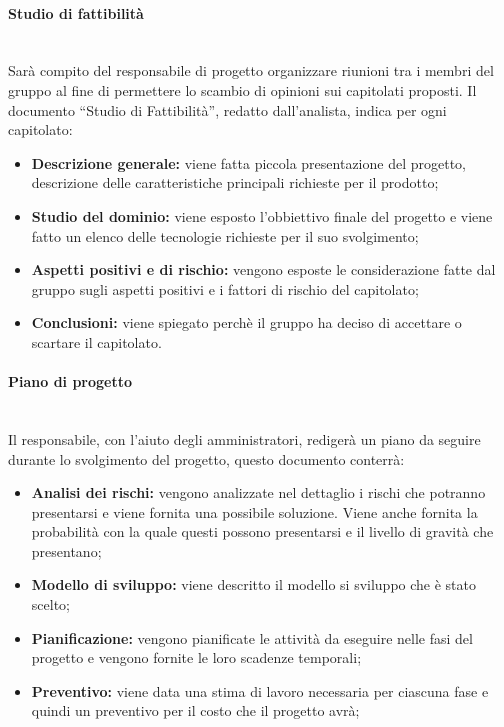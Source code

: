 \paragraph{Studio di fattibilità} \mbox{}\\
Sarà compito del responsabile di progetto organizzare riunioni tra i membri del gruppo al fine di permettere lo scambio di opinioni sui capitolati proposti.
Il documento ``Studio di Fattibilità'', redatto dall'analista, indica per ogni capitolato:
\begin{itemize}
	\item \textbf{Descrizione generale:} viene fatta piccola presentazione del progetto, descrizione delle caratteristiche principali richieste per il prodotto;
	\item \textbf{Studio del dominio:} viene esposto l'obbiettivo finale del progetto e viene fatto un elenco delle tecnologie richieste per il suo svolgimento;
	\item \textbf{Aspetti positivi e di rischio:} vengono esposte le considerazione fatte dal gruppo sugli aspetti positivi e i fattori di rischio del capitolato;
	\item \textbf{Conclusioni:} viene spiegato perchè il gruppo ha deciso di accettare o scartare il capitolato.
\end{itemize}
\paragraph{Piano di progetto} \mbox{}\\
Il responsabile, con l'aiuto degli amministratori, redigerà un piano da seguire durante lo svolgimento del progetto, questo documento conterrà:
\begin{itemize}
	\item \textbf{Analisi dei rischi:} vengono analizzate nel dettaglio i rischi che potranno presentarsi e viene fornita una possibile soluzione. Viene anche fornita la probabilità con la quale questi possono presentarsi e il livello di gravità che presentano;
	\item \textbf{Modello di sviluppo:} viene descritto il modello si sviluppo che è stato scelto;
	\item \textbf{Pianificazione:} vengono pianificate le attività da eseguire nelle fasi del progetto e vengono fornite le loro scadenze temporali;
	\item \textbf{Preventivo:} viene data una stima di lavoro necessaria per ciascuna fase e quindi un preventivo per il costo che il progetto avrà;
\end{itemize}
